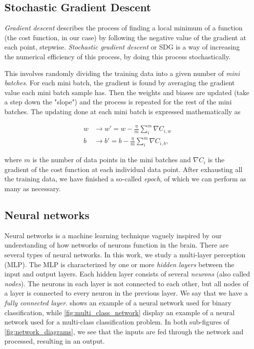 \documentclass[../main.tex]{subfiles}
\begin{document}
\subsection{Stochastic Gradient Descent}\label{sec:sgd}
\textit{Gradient descent} describes the process of finding a local minimum of a function (the cost function, in our case) by following the negative value of the gradient at each point, stepwise. \textit{Stochastic gradient descent} or SDG is a way of increasing the numerical efficiency of this process, by doing this process stochastically.

This involves randomly dividing the training data into a given number of \textit{mini batches}. For each mini batch, the gradient is found by averaging the gradient value each mini batch sample has. Then the weights and biases are updated (take a step down the "slope") and the process is repeated for the rest of the mini batches. The updating done at each mini batch is expressed mathematically as

\begin{align*}
    w&\rightarrow w' = w - \frac{\eta}{m}\sum_i^m \nabla C_{i,w} \\
    b&\rightarrow b' = b - \frac{\eta}{m}\sum_i^m \nabla C_{i,b},
\end{align*}

where $m$ is the number of data points in the mini batches and $\nabla C_i$ is the gradient of the cost function at each individual data point. After exhausting all the training data, we have finished a so-called \textit{epoch}, of which we can perform as many as necessary.

\subsection{Neural networks}
Neural networks is a machine learning technique vaguely inspired by our understanding of how networks of neurons function in the brain. There are several types of neural networks. In this work, we study a multi-layer perception (MLP). The MLP is characterized by one or more \textit{hidden layers} between the input and output layers. Each hidden layer consists of several \textit{neurons} (also called \textit{nodes}). The neurons in each layer is not connected to each other, but 
all nodes of a layer is connected to every neuron in the previous layer. We say that we have a \textit{fully connected layer}. 
 shows an example of a neural network used for binary classification, while \cref{fig:multi_class_network} display an  example of a neural network used for a multi-class classification problem. In both sub-figures of \cref{fig:network_diagrams}, we see that the inputs are fed through the network and processed, resulting in an output. 
\end{document}

